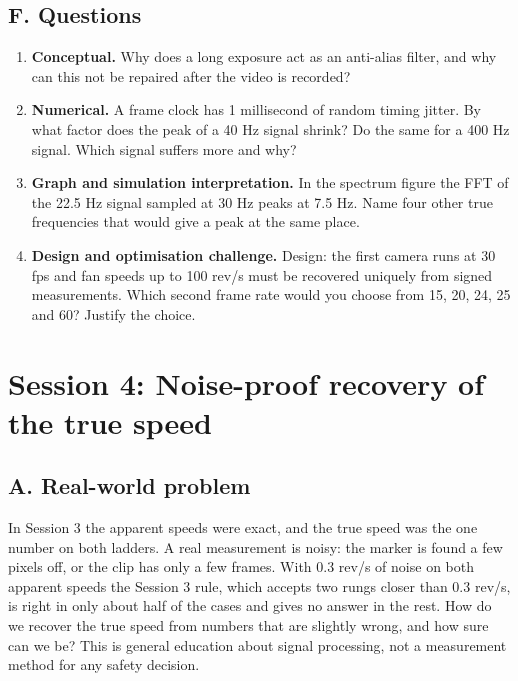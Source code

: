 \documentclass[11pt,a4paper]{article}
\begin{document}
\subsection*{F. Questions}
\begin{enumerate}[nosep]
\item \textbf{Conceptual.} Why does a long exposure act as an anti-alias filter, and why can this not be repaired after the video is recorded?
\item \textbf{Numerical.} A frame clock has 1 millisecond of random timing jitter. By what factor does the peak of a 40 Hz signal shrink? Do the same for a 400 Hz signal. Which signal suffers more and why?
\item \textbf{Graph and simulation interpretation.} In the spectrum figure the FFT of the 22.5 Hz signal sampled at 30 Hz peaks at 7.5 Hz. Name four other true frequencies that would give a peak at the same place.
\item \textbf{Design and optimisation challenge.} Design: the first camera runs at 30 fps and fan speeds up to 100 rev/s must be recovered uniquely from signed measurements. Which second frame rate would you choose from 15, 20, 24, 25 and 60? Justify the choice.
\end{enumerate}

\section{Session 4: Noise-proof recovery of the true speed}

\subsection*{A. Real-world problem}
In Session 3 the apparent speeds were exact, and the true speed was the one number on both ladders. A real measurement is noisy: the marker is found a few pixels off, or the clip has only a few frames. With 0.3 rev/s of noise on both apparent speeds the Session 3 rule, which accepts two rungs closer than 0.3 rev/s, is right in only about half of the cases and gives no answer in the rest. How do we recover the true speed from numbers that are slightly wrong, and how sure can we be? This is general education about signal processing, not a measurement method for any safety decision.
\end{document}
